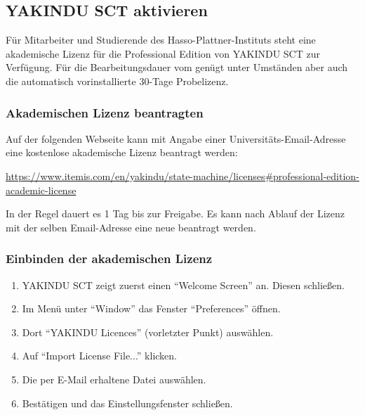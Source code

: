 



\subsection{YAKINDU SCT aktivieren}

Für Mitarbeiter und Studierende des Hasso-Plattner-Instituts steht eine akademische Lizenz für die Professional Edition von YAKINDU SCT zur Verfügung.
Für die Bearbeitungsdauer vom \docProjectTitle{} genügt unter Umständen aber auch die automatisch vorinstallierte 30-Tage Probelizenz.



\subsubsection*{Akademischen Lizenz beantragten}

Auf der folgenden Webseite kann mit Angabe einer Universitäts-Email-Adresse eine kostenlose akademische Lizenz beantragt werden:

\begin{center}
	\url{https://www.itemis.com/en/yakindu/state-machine/licenses#professional-edition-academic-license}
\end{center}


In der Regel dauert es 1 Tag bis zur Freigabe. Es kann nach Ablauf der Lizenz mit der selben Email-Adresse eine neue beantragt werden.



\subsubsection*{Einbinden der akademischen Lizenz}

\begin{enumerate}
	\setlength\topsep{-1em}
	\setlength\itemsep{-0.5em}
	\item YAKINDU SCT zeigt zuerst einen \enquote{Welcome Screen} an. Diesen schließen.
	\item Im Menü unter \enquote{Window} das Fenster \enquote{Preferences} öffnen.
	\item Dort \enquote{YAKINDU Licences} (vorletzter Punkt) auswählen.
	\item Auf \enquote{Import License File...} klicken.
	\item Die per E-Mail erhaltene Datei auswählen.
	\item Bestätigen und das Einstellungsfenster schließen.
\end{enumerate}





